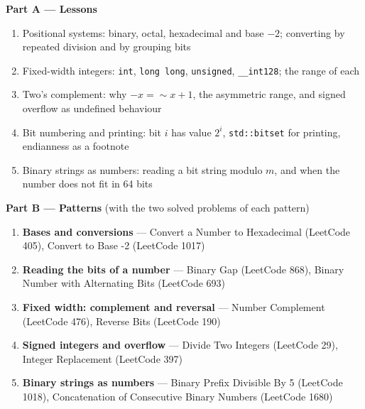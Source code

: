 \begin{plannedbox}
\textbf{Part A --- Lessons}
\begin{enumerate}[leftmargin=*, label=\textbf{A\arabic*.}, itemsep=1pt]
    \item Positional systems: binary, octal, hexadecimal and base $-2$; converting by repeated division and by grouping bits
    \item Fixed-width integers: \texttt{int}, \texttt{long long}, \texttt{unsigned}, \texttt{\_\_int128}; the range of each
    \item Two's complement: why $-x = \sim x + 1$, the asymmetric range, and signed overflow as undefined behaviour
    \item Bit numbering and printing: bit $i$ has value $2^i$, \texttt{std::bitset} for printing, endianness as a footnote
    \item Binary strings as numbers: reading a bit string modulo $m$, and when the number does not fit in 64 bits
\end{enumerate}
\textbf{Part B --- Patterns} (with the two solved problems of each pattern)
\begin{enumerate}[leftmargin=*, label=\textbf{P\arabic*.}, itemsep=1pt]
    \item \textbf{Bases and conversions} --- Convert a Number to Hexadecimal {\small\color{darkgray}(LeetCode 405)}, Convert to Base -2 {\small\color{darkgray}(LeetCode 1017)}
    \item \textbf{Reading the bits of a number} --- Binary Gap {\small\color{darkgray}(LeetCode 868)}, Binary Number with Alternating Bits {\small\color{darkgray}(LeetCode 693)}
    \item \textbf{Fixed width: complement and reversal} --- Number Complement {\small\color{darkgray}(LeetCode 476)}, Reverse Bits {\small\color{darkgray}(LeetCode 190)}
    \item \textbf{Signed integers and overflow} --- Divide Two Integers {\small\color{darkgray}(LeetCode 29)}, Integer Replacement {\small\color{darkgray}(LeetCode 397)}
    \item \textbf{Binary strings as numbers} --- Binary Prefix Divisible By 5 {\small\color{darkgray}(LeetCode 1018)}, Concatenation of Consecutive Binary Numbers {\small\color{darkgray}(LeetCode 1680)}
\end{enumerate}
\end{plannedbox}
